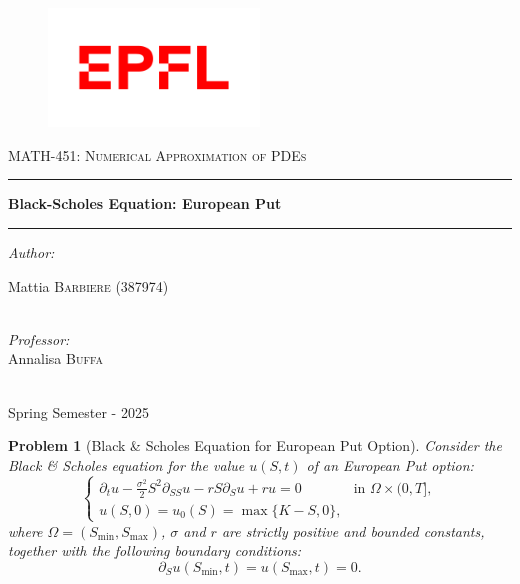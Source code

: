 \documentclass{article}
\newtheorem{problem}{Problem}[section]
\begin{document}
\thispagestyle{empty}

\begin{figure}
\centering
\includegraphics[width=0.5\textwidth]{code/images/LOGO.png}
\end{figure}
\vspace{0.5cm}
\begin{center}
\textsc{ \Large MATH-451: Numerical Approximation of PDEs}
\vspace{1.5cm}
\hrule
\vspace{0.5cm}
{\huge \bfseries Black-Scholes Equation: European Put}
\vspace{0.5cm}
\hrule
\vspace{1.5cm}


\emph{\Large \centering Author:}\\
\vspace{0.3cm}

\large Mattia \textsc{\large Barbiere} (387974)\\

~

\vspace{0.5cm}


\emph{\Large \centering Professor:}\\
\vspace{0.3cm}
\large  Annalisa  \textsc{\large Buffa}\\
~

\vspace{0.5cm}

\large Spring Semester - 2025

\end{center}

\clearpage
{}

\begin{problem}[Black \& Scholes Equation for European Put Option]\label{def:problem}
Consider the Black \& Scholes equation for the value \( u(S, t) \) of an European Put option:
\[
\begin{cases}
\partial_t u - \frac{\sigma^2}{2} S^2 \partial_{SS} u - r S \partial_S u + r u = 0 & \text{in } \Omega \times (0, T], \\
u(S, 0) = u_0(S) = \max \{ K - S, 0 \},
\end{cases}
\]
where \(\Omega = (S_{\min}, S_{\max})\), \(\sigma\) and \(r\) are strictly positive and bounded constants, together with the following boundary conditions:
\[
\partial_S u(S_{\min}, t) = u(S_{\max}, t) = 0.
\]
\end{problem}
\end{document}
